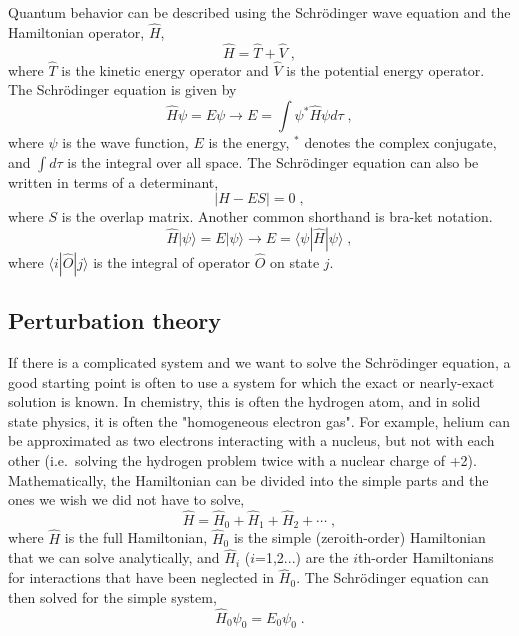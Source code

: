 \documentclass[12pt]{report}
\begin{document}
Quantum behavior can be described using the Schr\"{o}dinger wave equation and
the Hamiltonian operator, $\hat H$,
\begin{equation}
 \hat H = \hat T + \hat V \; ,
\end{equation}
where $\hat T$ is the kinetic energy operator and $\hat V$ is the potential
energy operator.
The Schr\"{o}dinger equation is given by
\begin{equation}
 \hat H\psi = E\psi \to E = \int \psi^*\hat H\psi d\tau \; ,
\end{equation}
where $\psi$ is the wave function, $E$ is the energy, $^*$ denotes the complex
conjugate, and $\int d\tau$ is the integral over all space.
The Schr\"{o}dinger equation can also be written in terms of a determinant,
\begin{equation}
 |H-ES| = 0 \; ,
\end{equation}
where $S$ is the overlap matrix.
Another common shorthand is bra-ket notation.
\begin{equation}
 \hat H|\psi\rangle = E|\psi\rangle \to E=\langle\psi|\hat H|\psi\rangle \; ,
\end{equation}
where $\langle i|\hat O|j\rangle$ is the integral of operator $\hat O$ on
state $j$.

\subsection{Perturbation theory}

If there is a complicated system and we want to solve the Schr\"{o}dinger
equation, a good starting point is often to use a system for which the exact
or nearly-exact solution is known.
In chemistry, this is often the hydrogen atom, and in solid state physics, it
is often the "homogeneous electron gas".
For example, helium can be approximated as two electrons interacting with a
nucleus, but not with each other (i.e.\ solving the hydrogen problem twice
with a nuclear charge of +2). \\

Mathematically, the Hamiltonian can be divided into the simple parts and the
ones we wish we did not have to solve,
\begin{equation}
 \hat H = \hat H_0+\hat H_1+\hat H_2+\cdots \; ,
\end{equation}
where $\hat H$ is the full Hamiltonian, $\hat H_0$ is the simple
(zeroith-order) Hamiltonian that we can solve analytically, and $\hat H_i$
($i$=1,2...) are the $i$th-order Hamiltonians for interactions that have been
neglected in $\hat H_0$.
The Schr\"{o}dinger equation can then solved for the simple system,
\begin{equation}
 \hat H_0\psi_0=E_0\psi_0 \; .
\end{equation}
\end{document}
